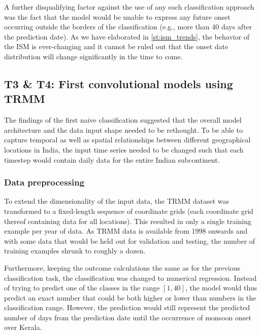 A further disqualifying factor against the use of any such classification approach was the fact that the model would be unable to express any future onset occurring outside the borders of the classification (e.g., more than 40 days after the prediction date). As we have elaborated in \cref{st:ism_trends}, the behavior of the ISM is ever-changing and it cannot be ruled out that the onset date distribution will change significantly in the time to come.


\subsection{T3 \& T4: First convolutional models using TRMM}
\label{sst:nn_t3}
The findings of the first naive classification suggested that the overall model architecture and the data input shape needed to be rethought. To be able to capture temporal as well as spatial relationships between different geographical locations in India, the input time series needed to be changed such that each timestep would contain daily data for the entire Indian subcontinent.

\subsubsection{Data preprocessing}
\label{ssst:nn_t3_data}
To extend the dimensionality of the input data, the TRMM dataset was transformed to a fixed-length sequence of coordinate grids (each coordinate grid thereof containing data for all locations). This resulted in only a single training example per year of data. As TRMM data is available from 1998 onwards and with some data that would be held out for validation and testing, the number of training examples shrunk to roughly a dozen.

Furthermore, keeping the outcome calculations the same as for the previous classification task, the classification was changed to numerical regression. Instead of trying to predict one of the classes in the range $\left[ 1, 40 \right]$, the model would thus predict an exact number that could be both higher or lower than numbers in the classification range. However, the prediction would still represent the predicted number of days from the prediction date until the occurrence of monsoon onset over Kerala.

